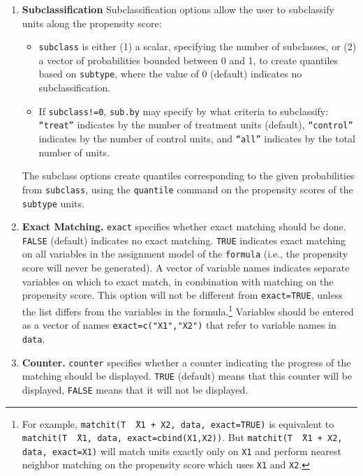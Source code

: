 \documentclass[oneside,letterpaper,titlepage]{article}
\begin{document}
\begin{enumerate}
\item \textbf{Subclassification}
  Subclassification options allow the user to subclassify units along
  the propensity score:
  \begin{itemize}
  \item \texttt{subclass} is either (1) a scalar, specifying the number of
    subclasses, or (2) a vector of probabilities bounded
    between 0 and 1, to create quantiles based on \texttt{subtype}, where the value of
    0 (default) indicates no subclassification.  
  \item If \texttt{subclass!=0}, \texttt{sub.by} may specify by what
    criteria to subclassify: \texttt{``treat''} indicates by the number of treatment units (default), \texttt{``control''} indicates by the number 
of control units, and \texttt{``all''} indicates by the total number of units.  
  \end{itemize}
  The subclass options create quantiles corresponding to the given
  probabilities from \texttt{subclass}, using the \texttt{quantile}
  command on the propensity scores of the \texttt{subtype} units. 

\item \textbf{Exact Matching.}  \texttt{exact} specifies whether exact
  matching should be done.  \texttt{FALSE} (default) indicates no exact 
  matching.  \texttt{TRUE} indicates exact matching on all variables in the 
  assignment model of the \texttt{formula} (i.e., the propensity score
  will never be generated).  A vector of variable names indicates separate variables on
  which to exact match, in combination with matching on the propensity
  score.  This option will not be different from \texttt{exact=TRUE},
  unless the list differs from the variables in the formula.\footnote{For
    example, \texttt{matchit(T \~\ X1 + X2, data, exact=TRUE)} is
    equivalent to \texttt{matchit(T \~\ X1, data, exact=cbind(X1,X2))}.
    But \texttt{matchit(T \~\ X1 + X2, data, exact=X1)} will match
    units exactly only on \texttt{X1} and perform nearest neighbor
    matching on the propensity score which uses \texttt{X1} and \texttt{X2}.} 
  Variables should be entered as a vector of names 
  \texttt{exact=c("X1","X2")} that refer to variable names in \texttt{data}.

\item \textbf{Counter.} \texttt{counter} specifies whether a counter indicating the progress of the matching should be displayed.  \texttt{TRUE} (default) means
that this counter will be displayed, \texttt{FALSE} means that it will not be displayed.

\end{enumerate}
  
\end{document}
